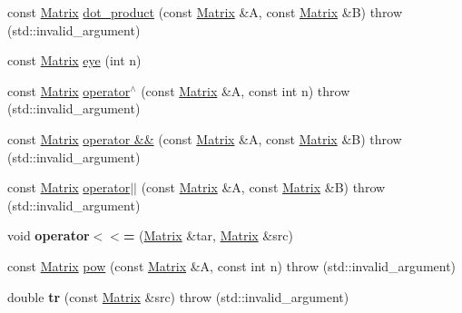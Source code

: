 \begin{DoxyCompactItemize}
\item 
const \hyperlink{classkerbal_1_1math_1_1_matrix}{Matrix} \hyperlink{namespacekerbal_1_1math_a456d9abf69b41eb8edb6b7f09822b689}{dot\+\_\+product} (const \hyperlink{classkerbal_1_1math_1_1_matrix}{Matrix} \&A, const \hyperlink{classkerbal_1_1math_1_1_matrix}{Matrix} \&B)  throw (std\+::invalid\+\_\+argument)
\item 
const \hyperlink{classkerbal_1_1math_1_1_matrix}{Matrix} \hyperlink{namespacekerbal_1_1math_af4a1ae2b857e2633dcf7b1485796d90c}{eye} (int n)
\item 
const \hyperlink{classkerbal_1_1math_1_1_matrix}{Matrix} \hyperlink{namespacekerbal_1_1math_aaa366f09d5d49a57ed544d64eee47c38}{operator$^\wedge$} (const \hyperlink{classkerbal_1_1math_1_1_matrix}{Matrix} \&A, const int n)  throw (std\+::invalid\+\_\+argument)
\item 
const \hyperlink{classkerbal_1_1math_1_1_matrix}{Matrix} \hyperlink{namespacekerbal_1_1math_aee54e09d15f9889c9faddb862e0d6930}{operator \&\&} (const \hyperlink{classkerbal_1_1math_1_1_matrix}{Matrix} \&A, const \hyperlink{classkerbal_1_1math_1_1_matrix}{Matrix} \&B)  throw (std\+::invalid\+\_\+argument)
\item 
const \hyperlink{classkerbal_1_1math_1_1_matrix}{Matrix} \hyperlink{namespacekerbal_1_1math_a51f431f1f41e3bda5fe59a6854c3d3f7}{operator$\vert$$\vert$} (const \hyperlink{classkerbal_1_1math_1_1_matrix}{Matrix} \&A, const \hyperlink{classkerbal_1_1math_1_1_matrix}{Matrix} \&B)  throw (std\+::invalid\+\_\+argument)
\item 
\mbox{\label{namespacekerbal_1_1math_afac515cb6c469a17e4039dfa1d058227}} 
void {\bfseries operator$<$$<$=} (\hyperlink{classkerbal_1_1math_1_1_matrix}{Matrix} \&tar, \hyperlink{classkerbal_1_1math_1_1_matrix}{Matrix} \&src)
\item 
const \hyperlink{classkerbal_1_1math_1_1_matrix}{Matrix} \hyperlink{namespacekerbal_1_1math_a86b959cd43a4fe7ed04f513d67189acd}{pow} (const \hyperlink{classkerbal_1_1math_1_1_matrix}{Matrix} \&A, const int n)  throw (std\+::invalid\+\_\+argument)
\item 
\mbox{\label{namespacekerbal_1_1math_ac7930b93c82df53b088665d7e199d8b1}} 
double {\bfseries tr} (const \hyperlink{classkerbal_1_1math_1_1_matrix}{Matrix} \&src)  throw (std\+::invalid\+\_\+argument)
\item 
\mbox{\label{namespacekerbal_1_1math_a009f8b8d3ea7d505c88fe0598b4428ca}} 

\end{DoxyCompactItemize}
